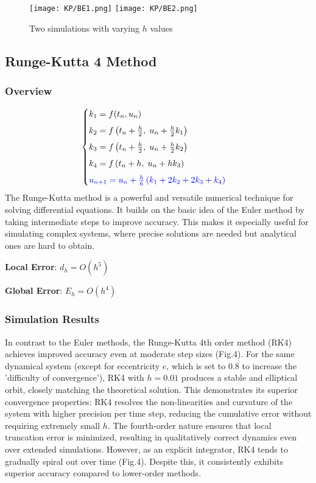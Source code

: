 \documentclass[11pt]{article}
\begin{document}
\begin{figure}[H]
  \centering
  \texttt{[image: KP/BE1.png]} \hfill
  \texttt{[image: KP/BE2.png]} 
  \caption{Two simulations with varying $h$ values}
  \label{fig:three-in-line}
\end{figure}


\subsection{Runge-Kutta 4 Method}
\subsubsection{Overview}
\[
\begin{cases}
k_1 = f(t_n, u_n) \\[5pt]
k_2 = f\left(t_n + \frac{h}{2},\; u_n + \frac{h}{2}k_1\right) \\[5pt]
k_3 = f\left(t_n + \frac{h}{2},\; u_n + \frac{h}{2}k_2\right) \\[5pt]
k_4 = f\left(t_n + h,\; u_n + h k_3\right) \\[5pt]
\color{blue}{u_{n+1} = u_n + \frac{h}{6} \left(k_1 + 2k_2 + 2k_3 + k_4\right)}  
\end{cases}
\]
The Runge-Kutta method is a powerful and versatile numerical technique for solving differential equations. It builds on the basic idea of the Euler method by taking intermediate steps to improve accuracy. This makes it especially useful for simulating complex systems, where precise solutions are needed but analytical ones are hard to obtain.

\textbf{Local Error}: $d_h = O(h^5)$

\textbf{Global Error}: $E_h = O(h^4)$

\subsubsection{Simulation Results}
In contrast to the Euler methods, the Runge-Kutta 4th order method (RK4) achieves improved accuracy even at moderate step sizes (Fig.4). For the same dynamical system (except for eccentricity $e$, which is set to $0.8$ to increase the 'difficulty of convergence'), RK4 with $h = 0.01$ produces a stable and elliptical orbit, closely matching the theoretical solution. This demonstrates its superior convergence properties: RK4 resolves the non-linearities and curvature of the system with higher precision per time step, reducing the cumulative error without requiring extremely small $h$. The fourth-order nature ensures that local truncation error is minimized, resulting in qualitatively correct dynamics even over extended simulations. However, as an explicit integrator, RK4 tends to gradually spiral out over time (Fig.4). Despite this, it consistently exhibits superior accuracy compared to lower-order methods.
\end{document}

